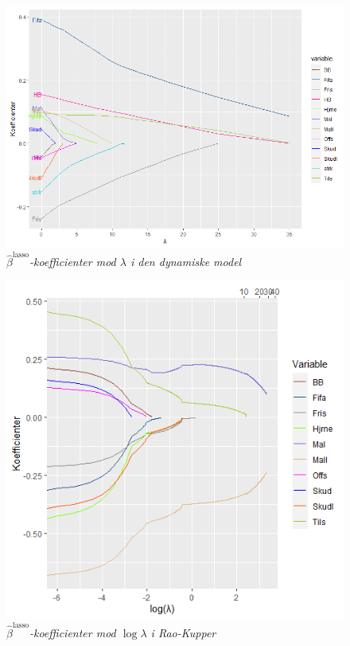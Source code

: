 \documentclass[11pt,a4paper]{article}
\begin{document}
\begin{figure}[h!]
    \centering
    \includegraphics[width=\textwidth]{LINEPLOTDYNALPHA.png}
    \caption{\textit{$\hat{\beta}^{\text{lasso}}$-koefficienter mod $\lambda$ i den dynamiske model}}
    \label{fig:DBetaLasso}
\end{figure}
\begin{figure}[h!]
    \centering
    \includegraphics[width=\textwidth,height=0.75\textwidth]{SKLMSA.png}
    \caption{\textit{$\hat{\beta}^{\text{lasso}}$-koefficienter mod $\log\lambda$ i Rao-Kupper}}
    \label{fig:SBetaLasso}
\end{figure}
\end{document}
